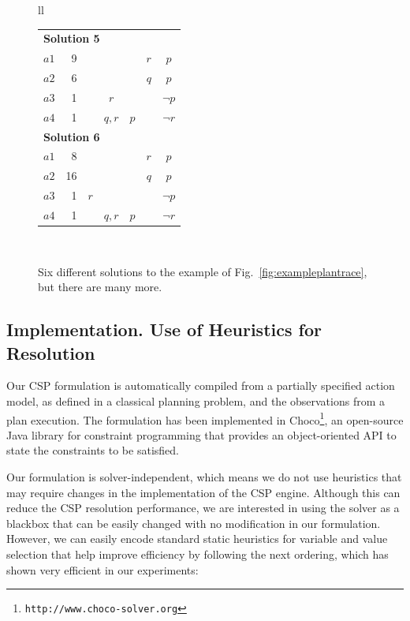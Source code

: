 \documentclass[runningheads]{llncs}
\begin{document}
\begin{figure}
\begin{tabular}{ll}
\begin{tabular}{cr|ccccc}
\hline

\multicolumn{7}{l}{\bf Solution 5} \\
$a1$ & 9 & & & & $r$ & $p$ \\
$a2$ & 6 & & & & $q$ & $p$ \\
$a3$ & 1 & & $r$ & & & $\neg p$ \\
$a4$ & 1 & & $q,r$ & $p$ & & $\neg r$ \\

\hline

\multicolumn{7}{l}{\bf Solution 6} \\
$a1$ & 8 & & & & $r$ & $p$ \\
$a2$ & 16 & & & & $q$ & $p$ \\
$a3$ & 1 & $r$ & & & & $\neg p$ \\
$a4$ & 1 & & $q,r$ & $p$ & & $\neg r$ \\

\end{tabular} \\

\end{tabular}
\normalsize

\caption{Six different solutions to the example of Fig.~\ref{fig:exampleplantrace}, but there are many more.}
\label{figure:solutionsExample}
\end{figure}


\subsection{Implementation. Use of Heuristics for Resolution}
\label{sec:implementation}

Our CSP formulation is automatically compiled from a partially specified action model, as defined in a classical planning problem, and the observations from a plan execution.
The formulation has been implemented in \textsf{Choco}\footnote{\texttt{http://www.choco-solver.org}}, an open-source Java library for constraint programming that provides an object-oriented API to state the constraints to be satisfied.

Our formulation is solver-independent, which means we do not use heuristics that may require changes in the implementation of the CSP engine.
Although this can reduce the CSP resolution performance, we are interested in using the solver as a blackbox that can be easily changed with no modification in our formulation. However, we can easily encode standard static heuristics for variable and value selection that help improve efficiency by following the next ordering, which has shown very efficient in our experiments:
\end{document}

